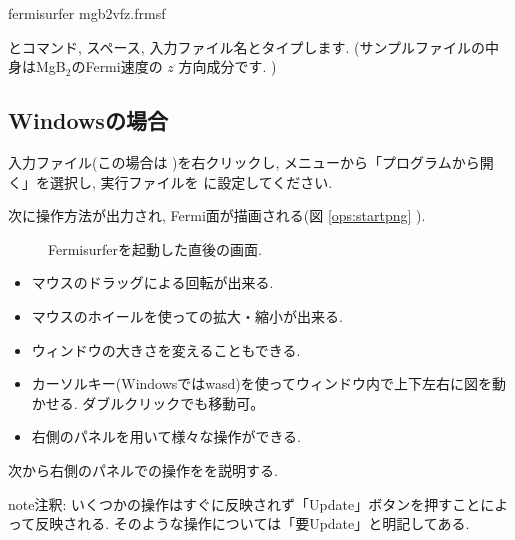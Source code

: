 \documentclass[letterpaper,10pt,dvipdfmx,openany]{sphinxmanual}
\let\sphinxpxdimen\pdfpxdimen\else\newdimen\sphinxpxdimen
\begin{document}
\begin{sphinxVerbatim}[commandchars=\\\{\}]
\PYGZdl{} fermisurfer mgb2\PYGZus{}vfz.frmsf
\end{sphinxVerbatim}

\sphinxAtStartPar
とコマンド, スペース, 入力ファイル名とタイプします.
(サンプルファイルの中身はMgB$_{\text{2}}$のFermi速度の \(z\) 方向成分です. )


\subsection{Windowsの場合}
\label{\detokenize{ops:windows}}
\sphinxAtStartPar
入力ファイル(この場合は )を右クリックし,
メニューから「プログラムから開く」を選択し,
実行ファイルを  に設定してください.

\sphinxAtStartPar
次に操作方法が出力され, Fermi面が描画される(図 \ref{ops:startpng} ).

\begin{figure}[htbp]
\centering
\capstart

\noindent\sphinxincludegraphics[width=500\sphinxpxdimen]{{start}.png}
\caption{Fermisurferを起動した直後の画面.}\label{\detokenize{ops:id23}}\label{\detokenize{ops:startpng}}\end{figure}
\begin{itemize}
\item {} 
\sphinxAtStartPar
マウスのドラッグによる回転が出来る.

\item {} 
\sphinxAtStartPar
マウスのホイールを使っての拡大・縮小が出来る.

\item {} 
\sphinxAtStartPar
ウィンドウの大きさを変えることもできる.

\item {} 
\sphinxAtStartPar
カーソルキー(Windowsではwasd)を使ってウィンドウ内で上下左右に図を動かせる.
ダブルクリックでも移動可。

\item {} 
\sphinxAtStartPar
右側のパネルを用いて様々な操作ができる.

\end{itemize}

\sphinxAtStartPar
次から右側のパネルでの操作をを説明する.

\begin{sphinxadmonition}{note}{注釈:}
\sphinxAtStartPar
いくつかの操作はすぐに反映されず「Update」ボタンを押すことによって反映される.
そのような操作については「要Update」と明記してある.
\end{sphinxadmonition}
\end{document}
